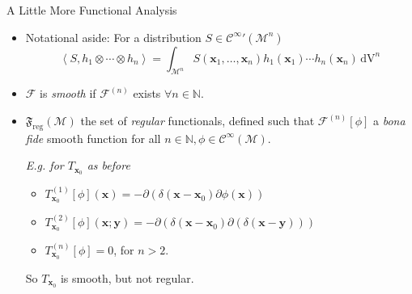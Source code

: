 \documentclass[pdf, fleqn, compress, handout]{beamer}
\newcommand{\mathsterm}[1]{{\itshape\color{dark-teal!80}#1}}
\newcommand{\ourex}[1]{{\itshape\color{viridian!70!black}#1}}
\begin{document}
\begin{frame}{A Little More Functional Analysis}
	\begin{itemize}
		\item	Notational aside: For a distribution
				$S \in {\mathcal{C}^\infty}'(\mathcal{M}^n)$
				\begin{equation*}
					\left\langle
						S,
						h_1 \otimes \cdots \otimes h_n
					\right\rangle
						=
					\int_{\mathcal{M}^n}
						S(\mathbf{x}_1, \ldots, \mathbf{x}_n)
						h_1(\mathbf{x}_1) \cdots h_n(\mathbf{x}_n)
					\, \mathrm{dV}^n					
				\end{equation*}
		\vspace{-1em}
		\pause
		\item	$\mathcal{F}$ is \mathsterm{smooth} if $\mathcal{F}^{(n)}$
				exists $\forall n \in \mathbb{N}$.
		\pause
		\item	$\mathfrak{F}_\mathrm{reg}(\mathcal{M})$ the set of
				\mathsterm{regular} functionals, defined such that
				$\mathcal{F}^{(n)}[\phi]$ a \textit{bona fide} smooth function for all
				$n   \in \mathbb{N},
				\phi \in \mathcal{C}^\infty(\mathcal{M})$.
		\vspace{1em}

		\pause
				\ourex{E.g. for $T_{\mathbf{x}_0}$ as before
				\begin{itemize}
					\item	$
								T_{\mathbf{x}_0}^{(1)}[\phi](\mathbf{x})
									=
								-\partial(\delta(\mathbf{x} - \mathbf{x}_0)
								 \partial \phi  (\mathbf{x}))
							$
					\item	$
								T_{\mathbf{x}_0}^{(2)}[\phi](\mathbf{x}; \mathbf{y})
									=
								-\partial(\delta(\mathbf{x} - \mathbf{x}_0)
								 \partial (\delta(\mathbf{x} - \mathbf{y})))
							$
					\item	$
								T_{\mathbf{x}_0}^{(n)}[\phi] = 0
							$,
							for $n > 2$.
				\end{itemize}
				So $T_{\mathbf{x}_0}$ is smooth, but not regular.
				}
	\end{itemize}
\end{frame}
\end{document}
